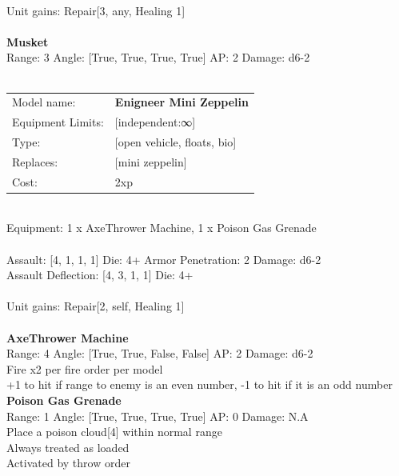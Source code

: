 \ \\
Unit gains: Repair[3, any, Healing 1]\\ 

\ \\
{\bf Musket } \\



Range: 3  Angle: [True, True, True, True] AP: 2 Damage: d6-2 \\




 
\ \\

\noindent
\begin{tabular}{ll}
Model name: &{\bf Enigneer Mini Zeppelin } \\
Equipment Limits: &[independent:∞] \\
Type: &[open vehicle, floats, bio] \\
Replaces: &[mini zeppelin] \\
Cost: & 2xp\\
\end{tabular}
\ \\
Equipment: 1 x AxeThrower Machine, 1 x Poison Gas Grenade \\
\ \\
Assault: [4, 1, 1, 1] Die: 4+ Armor Penetration: 2 Damage: d6-2 \\
Assault Deflection: [4, 3, 1, 1] Die: 4+\\
\indent  
\ \\
Unit gains: Repair[2, self, Healing 1]\\ 

\ \\
{\bf AxeThrower Machine } \\



Range: 4  Angle: [True, True, False, False] AP: 2 Damage: d6-2 \\
Fire x2 per fire order per model\\ 
+1 to hit if range to enemy is an even number, -1 to hit if it is an odd number\\ 




{\bf Poison Gas Grenade } \\



Range: 1  Angle: [True, True, True, True] AP: 0 Damage: N.A \\
Place a poison cloud[4] within normal range\\ 
Always treated as loaded\\ 
Activated by throw order\\ 




